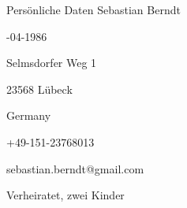 \begin{rubric}{Persönliche Daten}
  \entry*[Name]%
  Sebastian Berndt

  -04-1986

  \entry*[Adresse]%
  Selmsdorfer Weg 1
  \par 23568 Lübeck
  \par Germany

  \entry*[Telefon]%
  +49-151-23768013

  \entry*[Email]%
  sebastian.berndt@gmail.com

  \entry*[Familienstatus]%
  Verheiratet, zwei Kinder

%
\end{rubric}